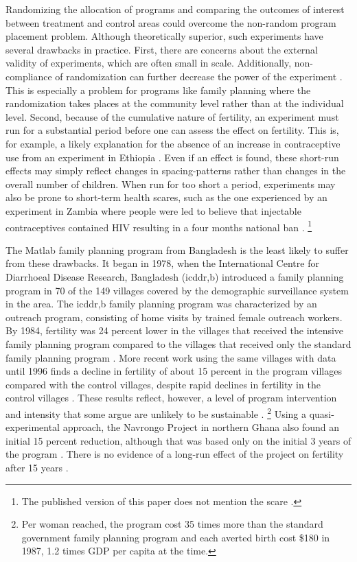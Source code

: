 \documentclass[letterpaper,12pt]{article}
\begin{document}
Randomizing the allocation of programs and comparing the outcomes of
interest between treatment and control areas could overcome the
non-random program placement problem.
Although theoretically superior, such experiments have several drawbacks
in practice.
First, there are concerns about the external validity of experiments,
which are often small in scale.
Additionally, non-compliance of randomization can further decrease the
power of the experiment \citep{Desai2011}.
This is especially a problem for programs like family planning where the
randomization takes places at the community level rather than at the
individual level.
Second, because of the cumulative nature of fertility, an experiment
must run for a substantial period before one can assess the effect on
fertility.
This is, for example, a likely explanation for the absence of an
increase in contraceptive use from an experiment in Ethiopia
\citep{Desai2011}.
Even if an effect is found, these short-run effects may simply reflect
changes in spacing-patterns rather than changes in the overall number of
children.
When run for too short a period, experiments may also be prone to
short-term health scares, such as the one experienced by an experiment
in Zambia where people were led to believe that injectable contraceptives
contained HIV resulting in a four months national ban \citep{Ashraf2009}.%
\footnote{
The published version of this paper does not mention the scare
\citep{Ashraf2014}.}

The Matlab family planning program from Bangladesh is the least likely
to suffer from these drawbacks.
It began in 1978, when the International Centre for Diarrhoeal Disease 
Research, Bangladesh (icddr,b) introduced a family planning program
in 70 of the 149 villages covered by the demographic surveillance system
in the area.
The icddr,b family planning program was characterized by an outreach
program, consisting of home visits by trained female outreach workers.
By 1984, fertility was 24 percent lower in the villages that received
the intensive family planning program compared to the villages that
received only the standard family planning program \citep{Phillips1988}.
More recent work using the same villages with data until 1996 finds a
decline in fertility of about 15 percent in the program villages
compared with the control villages, despite rapid declines in fertility
in the control villages \citep{Sinha2005,Joshi2007}.
These results reflect, however, a level of program intervention and
intensity that some argue are unlikely to be sustainable
\citep{pritchett94a}.%
\footnote{
Per woman reached, the program cost 35 times more than the standard
government family planning program and each averted birth cost \$180 in
1987, 1.2 times GDP per capita at the time.}
Using a quasi-experimental approach, the Navrongo Project in northern
Ghana also found an initial 15 percent reduction, although that was 
based only on the initial 3 years of the program \citep{Debpuur2002}.
There is no evidence of a long-run effect of the project on fertility
after 15 years \citep{Phillips2012}.
\end{document}
